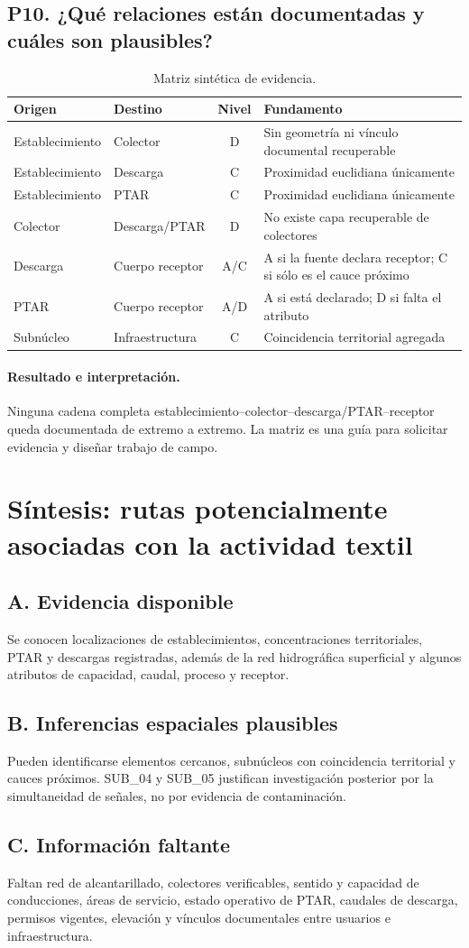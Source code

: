 \documentclass[11pt,letterpaper]{article}
\newcommand{\pregunta}[1]{\subsection{#1}}
\newcommand{\resultado}[1]{\paragraph{Resultado e interpretación.} #1}
\begin{document}
\pregunta{P10. ¿Qué relaciones están documentadas y cuáles son plausibles?}
\begin{table}[H]\centering\small\caption{Matriz sintética de evidencia.}\begin{tabular}{p{3cm}p{3cm}cp{7cm}}\toprule Origen&Destino&Nivel&Fundamento\\\midrule
Establecimiento&Colector&D&Sin geometría ni vínculo documental recuperable\\
Establecimiento&Descarga&C&Proximidad euclidiana únicamente\\
Establecimiento&PTAR&C&Proximidad euclidiana únicamente\\
Colector&Descarga/PTAR&D&No existe capa recuperable de colectores\\
Descarga&Cuerpo receptor&A/C&A si la fuente declara receptor; C si sólo es el cauce próximo\\
PTAR&Cuerpo receptor&A/D&A si está declarado; D si falta el atributo\\
Subnúcleo&Infraestructura&C&Coincidencia territorial agregada\\\bottomrule\end{tabular}\end{table}
\resultado{Ninguna cadena completa establecimiento--colector--descarga/PTAR--receptor queda documentada de extremo a extremo. La matriz es una guía para solicitar evidencia y diseñar trabajo de campo.}

\section{Síntesis: rutas potencialmente asociadas con la actividad textil}
\subsection*{A. Evidencia disponible}
Se conocen localizaciones de establecimientos, concentraciones territoriales, PTAR y descargas registradas, además de la red hidrográfica superficial y algunos atributos de capacidad, caudal, proceso y receptor.
\subsection*{B. Inferencias espaciales plausibles}
Pueden identificarse elementos cercanos, subnúcleos con coincidencia territorial y cauces próximos. SUB\_04 y SUB\_05 justifican investigación posterior por la simultaneidad de señales, no por evidencia de contaminación.
\subsection*{C. Información faltante}
Faltan red de alcantarillado, colectores verificables, sentido y capacidad de conducciones, áreas de servicio, estado operativo de PTAR, caudales de descarga, permisos vigentes, elevación y vínculos documentales entre usuarios e infraestructura.
\end{document}
